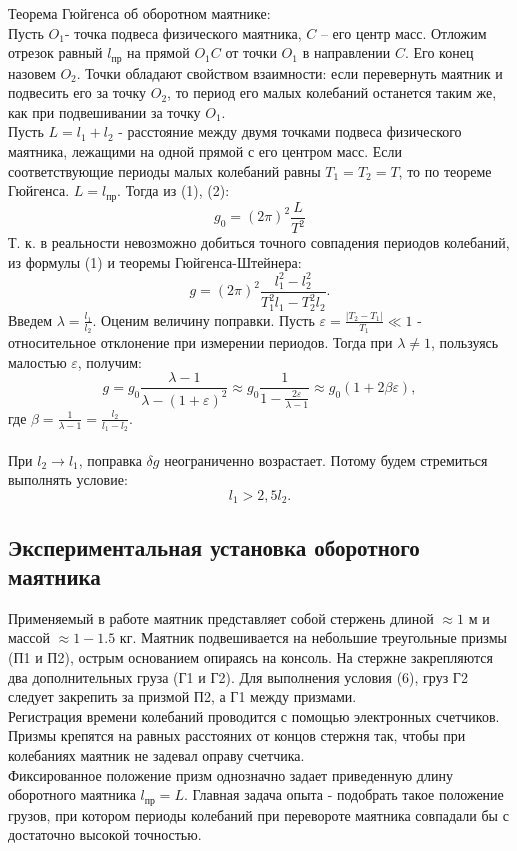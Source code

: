 \documentclass[a4paper]{article}
\begin{document}
\noindent 
Теорема Гюйгенса об оборотном маятнике: \\
Пусть $O_1$- точка подвеса физического маятника, $C$ -- его центр масс. Отложим отрезок равный $l_{пр}$ на прямой $O_1C$ от точки $O_1$ в направлении $C$. Его конец назовем $O_2$. Точки обладают свойством взаимности: если перевернуть маятник и подвесить его за точку $O_2$, то период его малых колебаний останется таким же, как при подвешивании за точку $O_1$. \\
Пусть $L=l_1+l_2$ - расстояние между двумя точками подвеса физического маятника, лежащими на одной прямой с его центром масс. Если соответствующие периоды малых колебаний равны $T_1 = T_2 = T$, то по теореме Гюйгенса. $L=l_{пр}$. Тогда из (1), (2):
 \begin{equation}g_0=(2\pi)^2\frac{L}{T^2} \end{equation}
Т. к. в реальности невозможно добиться точного совпадения периодов колебаний, из формулы (1) и теоремы Гюйгенса-Штейнера:
 \begin{equation}g=(2\pi)^2\frac{l_1^2-l_2^2}{T_1^2l_1-T_2^2l_2}. \end{equation}
\noindent
Введем $\lambda = \frac{l_1}{l_2}$.
Оценим величину поправки. Пусть $\varepsilon=\frac{|T_2-T_1|}{T_1} \ll 1$ - относительное отклонение при измерении периодов. Тогда при $\lambda\neq1$, пользуясь малостью $\varepsilon$, получим: 
 \begin{equation}g=g_0\frac{\lambda-1}{\lambda-(1+\varepsilon)^2}\approx g_0 \frac{1}{1-\frac{2\varepsilon}{\lambda-1}}\approx g_0(1+2\beta\varepsilon), \end{equation}
где $\beta=\frac{1}{\lambda-1}=\frac{l_2}{l_1-l_2}$. \\ \\
 При $l_2 \rightarrow l_1$, поправка $\delta g$ неограниченно возрастает. Потому будем стремиться выполнять условие: \begin{equation} l_1 > 2,5l_2. \end{equation}

\subsection{Экспериментальная установка оборотного маятника}
Применяемый в работе маятник представляет собой стержень длиной $\approx 1$ м и массой $\approx 1-1.5$ кг. Маятник подвешивается на небольшие треугольные призмы (П1 и П2), острым основанием опираясь на консоль. На стержне закрепляются два дополнительных груза (Г1 и Г2). Для выполнения условия (6), груз Г2 следует закрепить за призмой П2, а Г1 между призмами. \\
Регистрация времени колебаний проводится с помощью электронных счетчиков.  Призмы крепятся на равных расстояних от концов стержня так, чтобы при колебаниях маятник не задевал оправу счетчика.\\
Фиксированное положение призм однозначно задает приведенную длину оборотного маятника $l_{пр} = L$. Главная задача опыта - подобрать такое положение грузов, при котором периоды колебаний при перевороте маятника совпадали бы с достаточно высокой точностью.
\end{document}
